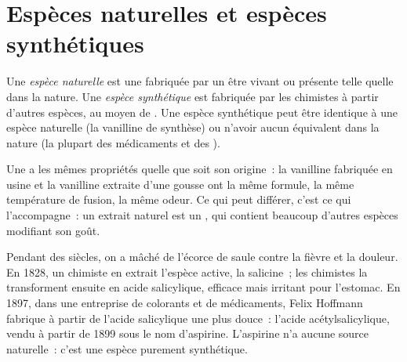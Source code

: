 \section{Espèces naturelles et espèces synthétiques}

\begin{definition}\label{def:g10:chemical-species:natural}
Une \emph{espèce naturelle} est une  fabriquée par un être vivant ou présente telle quelle dans la
nature. Une \emph{espèce
synthétique} est fabriquée par les chimistes à
partir d'autres espèces, au moyen de . Une espèce
synthétique peut être identique à une espèce naturelle (la vanilline de
synthèse) ou n'avoir aucun équivalent dans la nature (la plupart des
médicaments et des ).
\end{definition}

\begin{proposition}\label{prop:g10:chemical-species:same}
Une  a les mêmes propriétés quelle que soit son origine~:
la vanilline fabriquée en usine et la vanilline extraite d'une gousse ont
la même formule, la même température de fusion, la même odeur. Ce qui
peut différer, c'est ce qui l'accompagne~: un extrait naturel est un
, qui contient beaucoup d'autres espèces modifiant son goût.
\end{proposition}

\begin{history}
Pendant des siècles, on a mâché de l'écorce de saule contre la fièvre et
la douleur. En 1828, un chimiste en extrait l'espèce active, la
salicine~; les chimistes la transforment ensuite en acide salicylique,
efficace mais irritant pour l'estomac. En 1897, dans une entreprise de
colorants et de médicaments, Felix Hoffmann fabrique à partir de l'acide
salicylique une  plus douce~: l'acide
acétylsalicylique, vendu à partir de 1899 sous le nom d'aspirine.
L'aspirine n'a aucune source naturelle~: c'est une espèce purement
synthétique.
\end{history}

